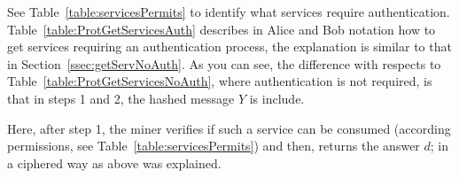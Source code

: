 See Table~\ref{table:servicesPermits} to identify what services require authentication.
Table~\ref{table:ProtGetServicesAuth} describes in Alice and Bob notation how to get services 
requiring an authentication process, the explanation is similar to that in 
Section~\ref{ssec:getServNoAuth}. As you can see, the difference with respects to 
Table~\ref{table:ProtGetServicesNoAuth}, where authentication is not required, is that in steps
1 and 2, the hashed message $Y$ is include.

Here, after step 1, the miner verifies if such a service can be consumed (according permissions, see
Table~\ref{table:servicesPermits}) and then, returns the answer $d$; in a ciphered way as above was 
explained.









